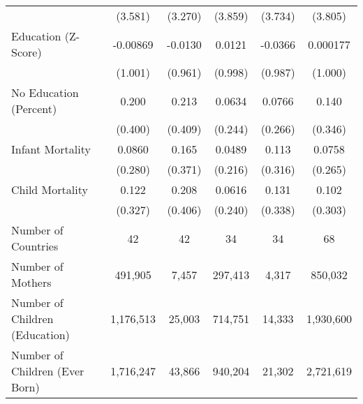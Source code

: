 \begin{table}[htpb!]
\begin{center}
{\begin{tabular}{lccccc}
&(3.581)&(3.270)&(3.859)&(3.734)&(3.805)\\
Education (Z-Score)&-0.00869&-0.0130&0.0121&-0.0366&0.000177\\
&(1.001)&(0.961)&(0.998)&(0.987)&(1.000)\\
No Education (Percent)&0.200&0.213&0.0634&0.0766&0.140\\
&(0.400)&(0.409)&(0.244)&(0.266)&(0.346)\\
Infant Mortality&0.0860&0.165&0.0489&0.113&0.0758\\
&(0.280)&(0.371)&(0.216)&(0.316)&(0.265)\\
Child Mortality&0.122&0.208&0.0616&0.131&0.102\\
&(0.327)&(0.406)&(0.240)&(0.338)&(0.303)\\
\midrule
Number of Countries &42&42&34&34&68 \\
Number of Mothers &491,905 &7,457 &297,413 &4,317 & 850,032 \\
Number of Children (Education) &1,176,513 &25,003 &714,751 &14,333 & 1,930,600 \\
Number of Children (Ever Born) &1,716,247 &43,866 &940,204 &21,302 & 2,721,619 \\
\bottomrule \end{tabular}}\end{center}\end{table}
